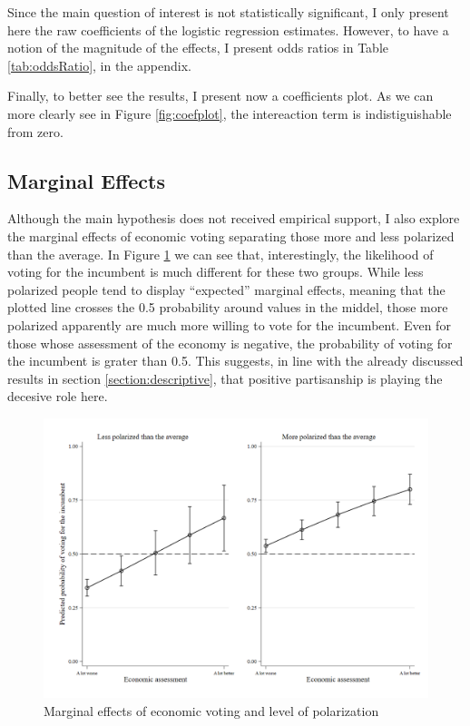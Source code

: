 \documentclass[a4paper, svgnames]{article}
\begin{document}
Since the main question of interest is not statistically significant, I only present here the raw coefficients of the logistic regression estimates. However, to have a notion of the magnitude of the effects, I present odds ratios in Table \ref*{tab:oddsRatio}, in the appendix.

Finally, to better see the results, I present now a coefficients plot. As we can more clearly see in Figure \ref*{fig:coefplot}, the intereaction term is indistiguishable from zero.

\subsection*{Marginal Effects}

Although the main hypothesis does not received empirical support, I also explore the marginal effects of economic voting separating those more and less polarized than the average. In Figure \ref{fig:margins} we can see that, interestingly, the likelihood of voting for the incumbent is much different for these two groups. While less polarized people tend to display ``expected'' marginal effects, meaning that the plotted line crosses the 0.5 probability around values in the middel, those more polarized apparently are much more willing to vote for the incumbent. Even for those whose assessment of the economy is negative, the probability of voting for the incumbent is grater than 0.5. This suggests, in line with the already discussed results in section \ref*{section:descriptive}, that positive partisanship is playing the decesive role here.


\begin{figure}[H]
	\centering
	\includegraphics[scale=0.35]{Figures/marginsplot.png}
	\caption{\label{fig:margins} Marginal effects of economic voting and level of polarization}
\end{figure}
\end{document}
